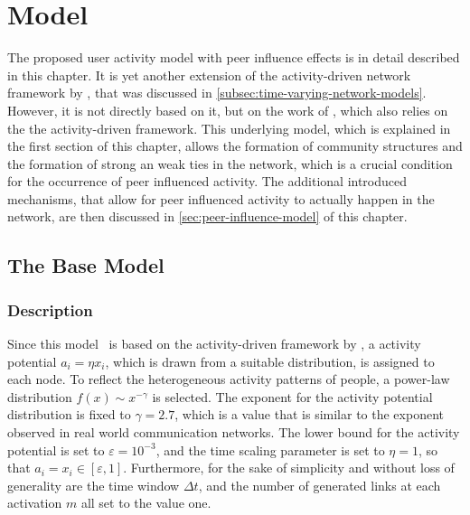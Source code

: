 \chapter{Model}

The proposed user activity model with peer influence effects is in detail described in this chapter.
It is yet another extension of the activity-driven network framework by \citet{Perra2012a}, that was discussed in \autoref{subsec:time-varying-network-models}.
However, it is not directly based on it, but on the work of \citet{Laurent2015}, which also relies on the the activity-driven framework.
This underlying model, which is explained in the first section of this chapter, allows the formation of community structures and the formation of strong an weak ties in the network, which is a crucial condition for the occurrence of peer influenced activity.
The additional introduced mechanisms, that allow for peer influenced activity to actually happen in the network, are then discussed in \autoref{sec:peer-influence-model} of this chapter.




\section{The Base Model}
\label{sec:base-model}


\subsection{Description}

Since this model~\cite{Laurent2015} is based on the activity-driven framework by \citet{Perra2012a}, a activity potential \( a_{i} = \eta x_{i}\),  which is drawn from a suitable distribution, is assigned to each node.
To reflect the heterogeneous activity patterns of people, a power-law distribution \( f(x) \sim x^{-\gamma}\) is selected.
The exponent for the activity potential distribution is fixed to \( \gamma = 2.7 \), which is a value that is similar to the exponent observed in real world communication networks.
The lower bound for the activity potential is set to \( \varepsilon = 10^{-3} \), and the time scaling parameter is set to \( \eta = 1\), so that \( a_{i} = x_{i} \in [\varepsilon, 1] \).
Furthermore, for the sake of simplicity and without loss of generality are the time window \( \Delta t \), and the number of generated links at each activation \( m \) all set to the value one.

